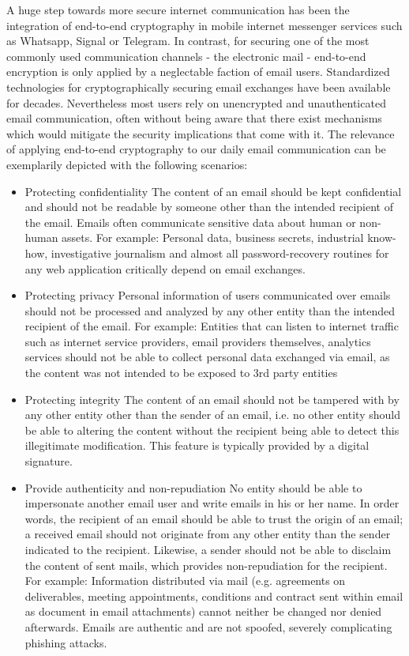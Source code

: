 A huge step towards more secure internet communication has been the integration of end-to-end cryptography in mobile internet messenger services such as Whatsapp, Signal or Telegram. In contrast, for securing one of the most commonly used communication channels - the electronic mail - end-to-end encryption is only applied by a neglectable faction \cite{secureEmail} of email users. Standardized technologies for cryptographically securing email exchanges have been available for decades. Nevertheless most users rely on unencrypted and unauthenticated email communication, often without being aware that there exist mechanisms which would mitigate the security implications that come with it. The relevance of applying end-to-end cryptography to our daily email communication can be exemplarily depicted with the following scenarios:
\begin{itemize}
	\item Protecting confidentiality \newline
	The content of an email should be kept confidential and should not be readable by someone other than the intended recipient of the email. Emails often communicate sensitive data about human or non-human assets.
	For example: Personal data, business secrets, industrial know-how, investigative journalism and almost all password-recovery routines for any web application critically depend on email exchanges.
	\item Protecting privacy \newline
	Personal information of users communicated over emails should not be processed and analyzed by any other entity than the intended recipient of the email.
	For example: Entities that can listen to internet traffic such as internet service providers, email providers themselves, analytics services should not be able to collect personal data exchanged via email, as the content was not intended to be exposed to 3rd party entities
	\item Protecting integrity \newline
	The content of an email should not be tampered with by any other entity other than the sender of an email, i.e. no other entity should be able to altering the content without the recipient being able to detect this illegitimate modification. This feature is typically provided by a digital signature.
	\item Provide authenticity and non-repudiation
	No entity should be able to impersonate another email user and write emails in his or her name. In order words, the recipient of an email should be able to trust the origin of an email; a received email should not originate from any other entity than the sender indicated to the recipient. Likewise, a sender should not be able to disclaim the content of sent mails, which provides non-repudiation for the recipient.
	For example: Information distributed via mail (e.g. agreements on deliverables, meeting appointments, conditions and contract sent within email as document in email attachments) cannot neither be changed nor denied afterwards.
	Emails are authentic and are not spoofed, severely complicating phishing attacks.
\end{itemize}
